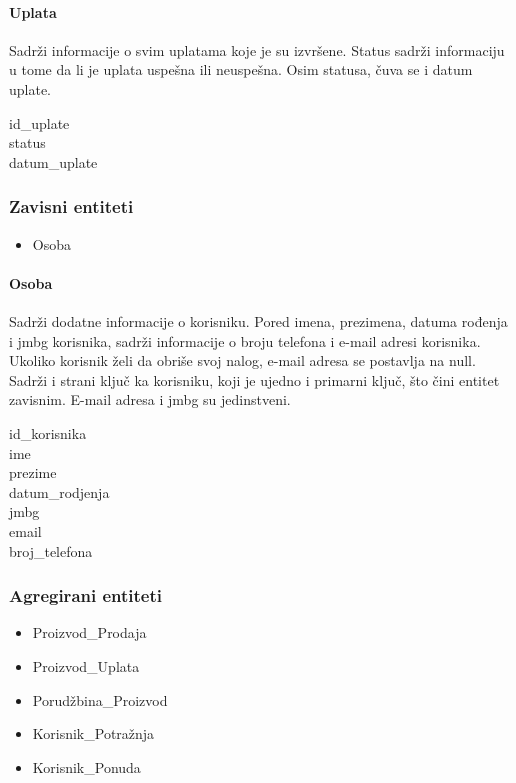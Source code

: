 \documentclass[a4paper, oneside]{article}
\begin{document}
\paragraph{Uplata} Sadrži informacije o svim uplatama koje je su izvršene. Status sadrži informaciju u tome da li je uplata uspešna ili neuspešna. Osim statusa, čuva se i datum uplate.
\begin{description}
    \item[id\_uplate]
    \item[status]
    \item[datum\_uplate]
\end{description}

\subsubsection{Zavisni entiteti}
\begin{itemize}
    \item Osoba
\end{itemize}
\paragraph{Osoba}
Sadrži dodatne informacije o korisniku. Pored imena, prezimena, datuma rođenja i jmbg korisnika, sadrži informacije o broju telefona i e-mail adresi korisnika. Ukoliko korisnik želi da obriše svoj nalog, e-mail adresa se postavlja na null. Sadrži i strani ključ ka korisniku, koji je ujedno i primarni ključ, što čini entitet zavisnim. E-mail adresa i jmbg su jedinstveni.
\begin{description}
    \item[id\_korisnika] 
    \item[ime]
    \item[prezime]
    \item[datum\_rodjenja]
    \item[jmbg]
    \item[email]
    \item[broj\_telefona]
\end{description}
\subsubsection{Agregirani entiteti}
\begin{itemize}
    \item Proizvod\_Prodaja
    \item Proizvod\_Uplata
    \item Porudžbina\_Proizvod
    \item Korisnik\_Potražnja
    \item Korisnik\_Ponuda
\end{itemize}
\end{document}
